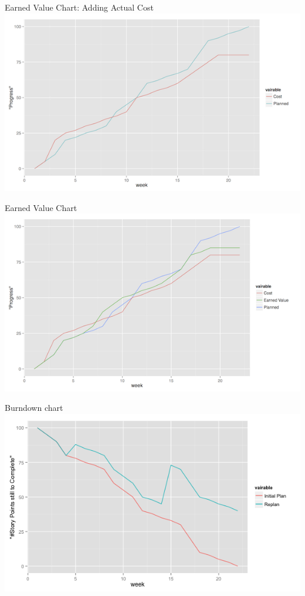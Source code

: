 \documentclass[10pt,t,a4paper]{beamer}
\begin{document}
\begin{frame}[label=sec-1-12]{Earned Value Chart: Adding Actual Cost}
\includegraphics[width=.9\linewidth]{../Site/images/IEV_Cost.png}
\end{frame}

\begin{frame}[label=sec-1-13]{Earned Value Chart}
\includegraphics[width=.9\linewidth]{../Site/images/IEV_Earned.png}
\end{frame}

\begin{frame}[label=sec-1-14]{Burndown chart}
\includegraphics[width=.9\linewidth]{../Site/images/FBurndown_Replan.png}
\end{frame}
\end{document}
